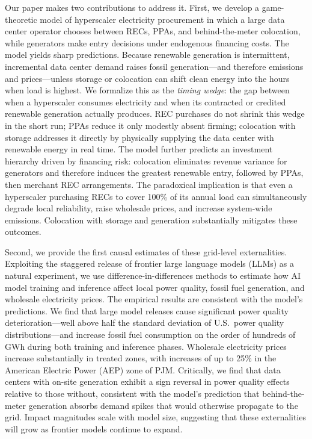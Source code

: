 \documentclass[a4paper,fleqn,longmktitle]{cas-sc}
\begin{document}
Our paper makes two contributions to address it. First, we develop a game-theoretic model of hyperscaler electricity procurement in which a large data center operator chooses between RECs, PPAs, and behind-the-meter colocation, while generators make entry decisions under endogenous financing costs. The model yields sharp predictions. Because renewable generation is intermittent, incremental data center demand raises fossil generation---and therefore emissions and prices---unless storage or colocation can shift clean energy into the hours when load is highest. We formalize this as the \emph{timing wedge}: the gap between when a hyperscaler consumes electricity and when its contracted or credited renewable generation actually produces. REC purchases do not shrink this wedge in the short run; PPAs reduce it only modestly absent firming; colocation with storage addresses it directly by physically supplying the data center with renewable energy in real time. The model further predicts an investment hierarchy driven by financing risk: colocation eliminates revenue variance for generators and therefore induces the greatest renewable entry, followed by PPAs, then merchant REC arrangements. The paradoxical implication is that even a hyperscaler purchasing RECs to cover 100\% of its annual load can simultaneously degrade local reliability, raise wholesale prices, and increase system-wide emissions. Colocation with storage and generation substantially mitigates these outcomes.
 
Second, we provide the first causal estimates of these grid-level externalities. Exploiting the staggered release of frontier large language models (LLMs) as a natural experiment, we use difference-in-differences methods to estimate how AI model training and inference affect local power quality, fossil fuel generation, and wholesale electricity prices. The empirical results are consistent with the model's predictions. We find that large model releases cause significant power quality deterioration---well above half the standard deviation of U.S.\ power quality distributions---and increase fossil fuel consumption on the order of hundreds of GWh during both training and inference phases. Wholesale electricity prices increase substantially in treated zones, with increases of up to 25\% in the American Electric Power (AEP) zone of PJM. Critically, we find that data centers with on-site generation exhibit a sign reversal in power quality effects relative to those without, consistent with the model's prediction that behind-the-meter generation absorbs demand spikes that would otherwise propagate to the grid. Impact magnitudes scale with model size, suggesting that these externalities will grow as frontier models continue to expand.
 
\end{document}
